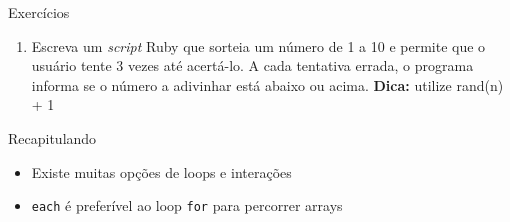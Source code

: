 \begin{frame}{Exercícios}
  \begin{enumerate}
    \item Escreva um \textit{script} Ruby que sorteia um número de 1 a 10 e permite que 
    o usuário tente 3 vezes até acertá-lo. A cada tentativa errada, o programa informa
    se o número a adivinhar está abaixo ou acima. \textbf{Dica:} utilize rand(n) + 1 
  \end{enumerate}
\end{frame}

\begin{frame}[fragile,t]{Recapitulando}
  \begin{itemize}
    \item Existe muitas opções de loops e interações
    \item \verb!each! é \alert{preferível} ao loop \verb!for! para percorrer arrays
  \end{itemize}
\end{frame}



